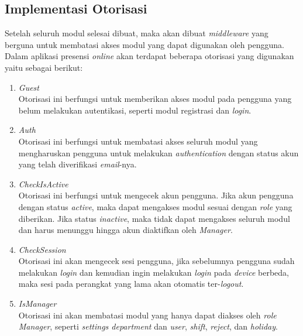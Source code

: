 \subsection{Implementasi Otorisasi}
Setelah seluruh modul selesai dibuat, maka akan dibuat \textit{middleware} yang berguna untuk membatasi akses modul yang dapat digunakan oleh pengguna. Dalam aplikasi presensi \textit{online} akan terdapat beberapa otorisasi yang digunakan yaitu sebagai berikut:
\begin{enumerate}
    \item \textit{Guest}
    \\ Otorisasi ini berfungsi untuk memberikan akses modul pada pengguna yang belum melakukan autentikasi, seperti modul registrasi dan \textit{login}. 

    \item \textit{Auth}
    \\ Otorisasi ini berfungsi untuk membatasi akses seluruh modul yang mengharuskan pengguna untuk melakukan \textit{authentication} dengan status akun yang telah diverifikasi \textit{email}-nya.
    
    \item \textit{CheckIsActive}
    \\ Otorisasi ini berfungsi untuk mengecek akun pengguna. Jika akun pengguna dengan status \textit{active}, maka dapat mengakses modul sesuai dengan \textit{role} yang diberikan. Jika status \textit{inactive}, maka tidak dapat mengakses seluruh modul dan harus menunggu hingga akun diaktifkan oleh \textit{Manager}.

    \item \textit{CheckSession}
    \\ Otorisasi ini akan mengecek sesi pengguna, jika sebelumnya pengguna sudah melakukan \textit{login} dan kemudian ingin melakukan \textit{login} pada \textit{device} berbeda, maka sesi pada perangkat yang lama akan otomatis ter-\textit{logout}.

    \item \textit{IsManager}
    \\ Otorisasi ini akan membatasi modul yang hanya dapat diakses oleh \textit{role Manager}, seperti \textit{settings department} dan \textit{user}, \textit{shift}, \textit{reject}, dan \textit{holiday}.
\end{enumerate}

